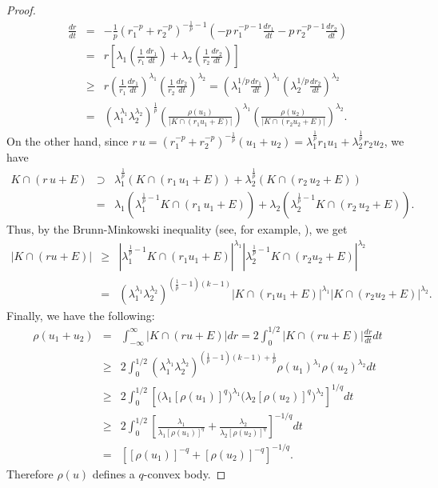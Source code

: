 \documentclass[12pt]{amsart} %
\renewcommand{\[}{\left[}
\renewcommand{\(}{\left(}
\renewcommand{\]}{\right]}
\renewcommand{\)}{\right)}
\renewcommand{\ge}{\geqslant}
\newcommand{\la}{\lambda}
\begin{document}
\begin{proof}
\begin{eqnarray*}
\frac{dr}{dt} &=& -\frac{1}{p}\left(r_1^{-p} +
r_2^{-p}\right)^{-\frac{1}{p}-1} \left( -p\,
r_1^{-p-1}\frac{dr_1}{dt}
- p\, r_2^{-p-1}\frac{dr_2}{dt} \right) \\
&=& r \left[ \la_1 \left(\frac{1}{r_1}\frac{dr_1}{dt}\right) +
\la_2 \left(\frac{1}{r_2}\frac{dr_2}{dt}\right) \right] \\
&\ge& r \left(\frac{1}{r_1}\frac{dr_1}{dt}\right)^{\la_1}
\left(\frac{1}{r_2}\frac{dr_2}{dt}\right)^{\la_2} =
\left(\la_1^{1/p}\frac{dr_1}{dt}\right)^{\la_1}
\left(\la_2^{1/p}\frac{dr_2}{dt}\right)^{\la_2} \\
&=& \left(\la_1^{\la_1}\la_2^{\la_2}\right)^{\frac{1}{p}}
\left(\frac{\rho (u_1)}{|K \cap (r_1 u_1+E)|}\right)^{\la_1}
\left(\frac{\rho (u_2)}{|K \cap (r_2 u_2+E)|}\right)^{\la_2}.
\end{eqnarray*}
On the other hand, since $r\,u = (r_1^{-p}+r_2^{-p})^{-\frac{1}{p}}
(u_1+u_2) = \la_1^{\frac{1}{p}}r_1u_1+\la_2^{\frac{1}{p}}r_2u_2$, we
have
\begin{eqnarray*}
K \cap (r\,u+E) &\supset& \la_1^{\frac{1}{p}}\left(K
\cap (r_1\, u_1+E)\right) + \la_2^{\frac{1}{p}}\left(K \cap (r_2\,u_2+E)\right) \\
&=& \la_1\left(\la_1^{\frac{1}{p}-1}K \cap (r_1\, u_1+E)\right) +
\la_2\left(\la_2^{\frac{1}{p}-1}K \cap (r_2\,u_2+E)\right).
\end{eqnarray*}
Thus, by the Brunn-Minkowski  inequality (see,  for example,  \cite{Ga3}), we get
\begin{eqnarray*}
|K \cap (ru+E)| &\ge& \left|\la_1^{\frac{1}{p}-1}K \cap (r_1
u_1+E)\right|^{\la_1} \left|\la_2^{\frac{1}{p}-1}K \cap (r_2
u_2+E)\right|^{\la_2} \\
&=& \left(\la_1^{\la_1}\la_2^{\la_2}\right)^{(\frac{1}{p}-1)(k-1)}
\left|K \cap (r_1 u_1+E)\right|^{\la_1} \left|K \cap (r_2
u_2+E)\right|^{\la_2}.
\end{eqnarray*}
Finally, we have the following:
\begin{eqnarray*}
\rho (u_1+u_2) &=& \int_{-\infty}^{\infty} \left|K \cap (r
u+E)\right|dr = 2\int_0^{1/2} \left|K \cap (r
u+E)\right|\frac{dr}{dt}dt \\
&\ge& 2\int_0^{1/2}
\left(\la_1^{\la_1}\la_2^{\la_2}\right)^{(\frac{1}{p}-1)(k-1)+\frac{1}{p}}
\rho (u_1)^{\la_1}\rho (u_2)^{\la_2} dt \\
&\ge& 2\int_0^{1/2}
 \left[ \Big(\la_1
\left[\rho (u_1)\right]^q\Big)^{\la_1} \Big(\la_2
\left[\rho (u_2)\right]^q\Big)^{\la_2} \right]^{1/q} dt\\
&\ge& 2\int_0^{1/2} \left[ \frac{\la_1}{\la_1
\left[\rho (u_1)\right]^q} + \frac{\la_2}{\la_2
\left[\rho (u_2)\right]^q}
\right]^{-1/q} dt\\
&=& \left[ \left[\rho (u_1)\right]^{-q} +
\left[\rho (u_2)\right]^{-q} \right]^{-1/q}.
\end{eqnarray*}
Therefore $\rho(u)$ defines a $q$-convex body.


\end{proof}
\end{document}
